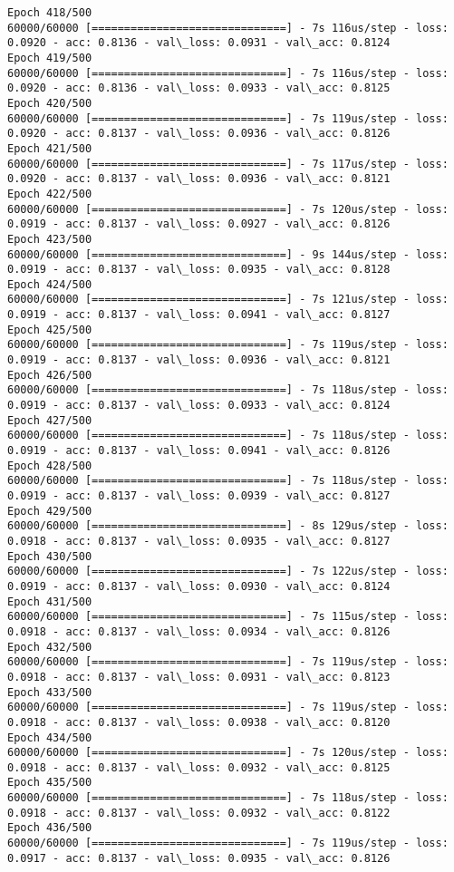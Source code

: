\documentclass[11pt]{article}
\begin{document}
\begin{Verbatim}[commandchars=\\\{\}]
Epoch 418/500
60000/60000 [==============================] - 7s 116us/step - loss: 0.0920 - acc: 0.8136 - val\_loss: 0.0931 - val\_acc: 0.8124
Epoch 419/500
60000/60000 [==============================] - 7s 116us/step - loss: 0.0920 - acc: 0.8136 - val\_loss: 0.0933 - val\_acc: 0.8125
Epoch 420/500
60000/60000 [==============================] - 7s 119us/step - loss: 0.0920 - acc: 0.8137 - val\_loss: 0.0936 - val\_acc: 0.8126
Epoch 421/500
60000/60000 [==============================] - 7s 117us/step - loss: 0.0920 - acc: 0.8137 - val\_loss: 0.0936 - val\_acc: 0.8121
Epoch 422/500
60000/60000 [==============================] - 7s 120us/step - loss: 0.0919 - acc: 0.8137 - val\_loss: 0.0927 - val\_acc: 0.8126
Epoch 423/500
60000/60000 [==============================] - 9s 144us/step - loss: 0.0919 - acc: 0.8137 - val\_loss: 0.0935 - val\_acc: 0.8128
Epoch 424/500
60000/60000 [==============================] - 7s 121us/step - loss: 0.0919 - acc: 0.8137 - val\_loss: 0.0941 - val\_acc: 0.8127
Epoch 425/500
60000/60000 [==============================] - 7s 119us/step - loss: 0.0919 - acc: 0.8137 - val\_loss: 0.0936 - val\_acc: 0.8121
Epoch 426/500
60000/60000 [==============================] - 7s 118us/step - loss: 0.0919 - acc: 0.8137 - val\_loss: 0.0933 - val\_acc: 0.8124
Epoch 427/500
60000/60000 [==============================] - 7s 118us/step - loss: 0.0919 - acc: 0.8137 - val\_loss: 0.0941 - val\_acc: 0.8126
Epoch 428/500
60000/60000 [==============================] - 7s 118us/step - loss: 0.0919 - acc: 0.8137 - val\_loss: 0.0939 - val\_acc: 0.8127
Epoch 429/500
60000/60000 [==============================] - 8s 129us/step - loss: 0.0918 - acc: 0.8137 - val\_loss: 0.0935 - val\_acc: 0.8127
Epoch 430/500
60000/60000 [==============================] - 7s 122us/step - loss: 0.0919 - acc: 0.8137 - val\_loss: 0.0930 - val\_acc: 0.8124
Epoch 431/500
60000/60000 [==============================] - 7s 115us/step - loss: 0.0918 - acc: 0.8137 - val\_loss: 0.0934 - val\_acc: 0.8126
Epoch 432/500
60000/60000 [==============================] - 7s 119us/step - loss: 0.0918 - acc: 0.8137 - val\_loss: 0.0931 - val\_acc: 0.8123
Epoch 433/500
60000/60000 [==============================] - 7s 119us/step - loss: 0.0918 - acc: 0.8137 - val\_loss: 0.0938 - val\_acc: 0.8120
Epoch 434/500
60000/60000 [==============================] - 7s 120us/step - loss: 0.0918 - acc: 0.8137 - val\_loss: 0.0932 - val\_acc: 0.8125
Epoch 435/500
60000/60000 [==============================] - 7s 118us/step - loss: 0.0918 - acc: 0.8137 - val\_loss: 0.0932 - val\_acc: 0.8122
Epoch 436/500
60000/60000 [==============================] - 7s 119us/step - loss: 0.0917 - acc: 0.8137 - val\_loss: 0.0935 - val\_acc: 0.8126

\end{Verbatim}
\end{document}
